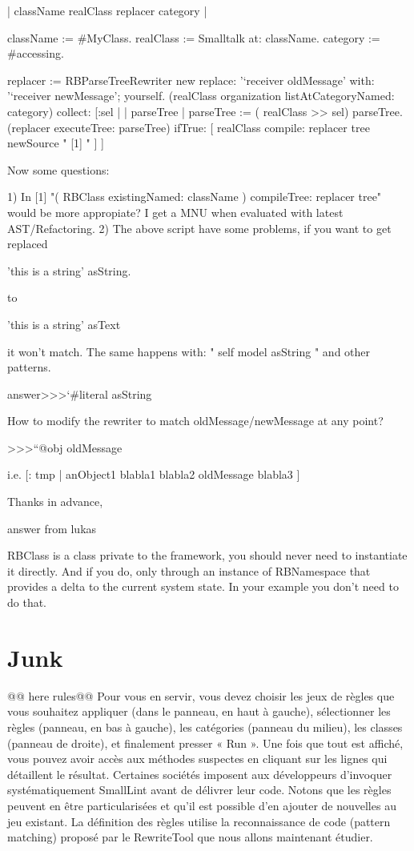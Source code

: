 \documentclass[a4paper,10pt,twoside]{book}
\begin{document}
\begin{code}{}
| className realClass replacer category |

className := #MyClass.
realClass := Smalltalk at: className.
category := #accessing.

replacer := RBParseTreeRewriter new
				replace: '`receiver oldMessage' with: '`receiver newMessage';
				yourself.
(realClass organization listAtCategoryNamed: category)
	collect: [:sel |
		| parseTree |
		parseTree := ( realClass >> sel) parseTree.
		(replacer executeTree: parseTree)
			ifTrue: [ realClass compile: replacer tree newSource " [1] " ] ]

Now some questions:

1) In [1] "( RBClass existingNamed: className ) compileTree: replacer
tree" would be more appropiate? I get a MNU when evaluated with latest
AST/Refactoring.
2) The above script have some problems, if you want to get replaced

'this is a string' asString.

to

'this is a string' asText

it won't match. The same happens with: " self model asString " and
other patterns. 

answer>>>`#literal asString


How to modify the rewriter to match
oldMessage/newMessage at any point?

>>>``@obj oldMessage


i.e. [: tmp | anObject1 blabla1 blabla2 oldMessage blabla3 ]

Thanks in advance,
\end{code}


answer from lukas
\begin{code}{}
RBClass is a class private to the framework, you should never need to
instantiate it directly. And if you do, only through an instance of
RBNamespace that provides a delta to the current system state. In your
example you don't need to do that.

\end{code}

\section{Junk}

@@ here rules@@
 Pour vous en servir,
vous devez choisir les jeux de r\`egles que vous souhaitez appliquer
(dans le panneau, en haut à gauche), s\'electionner les r\`egles (panneau,
en bas à gauche), les cat\'egories (panneau du milieu), les classes
(panneau de droite), et finalement presser « Run ». Une fois que tout
est affich\'e, vous pouvez avoir acc\`es aux m\'ethodes suspectes en
cliquant sur les lignes qui d\'etaillent le r\'esultat.  Certaines
soci\'et\'es imposent aux d\'eveloppeurs d'invoquer syst\'ematiquement
SmallLint avant de d\'elivrer leur code. Notons que les r\`egles peuvent
en être particularis\'ees et qu'il est possible d'en ajouter de
nouvelles au jeu existant. La d\'efinition des r\`egles utilise la
reconnaissance de code (pattern matching) propos\'e par le RewriteTool
que nous allons maintenant \'etudier.
\end{document}
